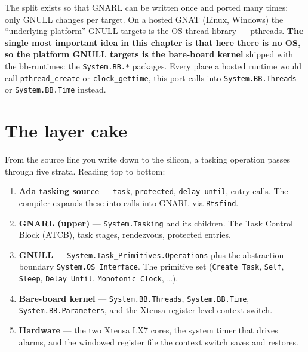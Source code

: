 The split exists so that GNARL can be written once and ported many times: only
GNULL changes per target. On a hosted GNAT (Linux, Windows) the ``underlying
platform'' GNULL targets is the OS thread library --- pthreads. \textbf{The
single most important idea in this chapter is that here there is no OS, so the
platform GNULL targets is the bare-board kernel} shipped with the bb-runtimes:
the \texttt{System.BB.*} packages. Every place a hosted runtime would call
\texttt{pthread\_create} or \texttt{clock\_gettime}, this port calls into
\texttt{System.BB.Threads} or \texttt{System.BB.Time} instead.


\section{The layer cake}

From the source line you write down to the silicon, a tasking operation passes
through five strata. Reading top to bottom:

\begin{enumerate}
  \item \textbf{Ada tasking source} --- \texttt{task}, \texttt{protected},
        \texttt{delay until}, entry calls. The compiler expands these into calls
        into GNARL via \texttt{Rtsfind}.
  \item \textbf{GNARL (upper)} --- \texttt{System.Tasking} and its children. The
        Task Control Block (ATCB), task stages, rendezvous, protected entries.
  \item \textbf{GNULL} --- \texttt{System.Task\_Primitives.Operations} plus the
        abstraction boundary \texttt{System.OS\_Interface}. The primitive set
        (\texttt{Create\_Task}, \texttt{Self}, \texttt{Sleep},
        \texttt{Delay\_Until}, \texttt{Monotonic\_Clock}, \dots).
  \item \textbf{Bare-board kernel} --- \texttt{System.BB.Threads},
        \texttt{System.BB.Time}, \texttt{System.BB.Parameters}, and the Xtensa
        register-level context switch.
  \item \textbf{Hardware} --- the two Xtensa LX7 cores, the system timer that
        drives alarms, and the windowed register file the context switch saves
        and restores.
\end{enumerate}

